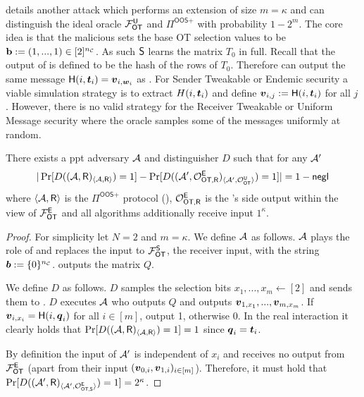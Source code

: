  details another attack which performs an extension of size $m=\kappa$ and can distinguish the ideal oracle $\OOT^\U$ and $\Pi^{\textsf{OOS+}}$ with probability $1-2^m$. The core idea is that the malicious \send sets the base OT selection values to be $\mathbf{b}:=(1,...,1)\in [2]^\nc$. As such $\send$ learns the matrix $T_0$ in full. Recall that the output of \rec is defined to be the hash of the rows of $T_0$. Therefore \send can output the same message $\H(i, \tt_i)=\vv_{i,\ww_i}$ as \rec. For Sender Tweakable or Endemic security a viable simulation strategy is to extract $H(i, \tt_i)$ and define $\vv_{i,j}:=\H(i, \tt_i)$ for all $j$. However, there is no valid strategy for the Receiver Tweakable or Uniform Message security where the oracle samples some of the messages uniformly at random.

\begin{lemma} \label{lem:malSend}
	There exists a ppt adversary $\Adv$ and distinguisher $D$ such that for any $\Adv'$ 
	$$
		|\Pr[D((\Adv, \rec)_{\langle\Adv,\rec\rangle})=1]-\Pr[D((\Adv', \O^{\E}_{\textsf{OT,\rec}})_{\langle\Adv',\O^{\U}_{\textsf{OT}}\rangle})=1]|=1-\negl
	$$
	where $\langle\Adv,\rec\rangle$ is the $\Pi^{\textsf{OOS+}}$ protocol (), $\O^{\E}_{\textsf{OT,\rec}}$ is the \rec's side output within the view of $\OOT^{\E}$ and all algorithms additionally receive input $1^\kappa$. 
\end{lemma}
\begin{proof} 
	For simplicity let $N=2$ and $m=\kappa$. We define $\Adv$ as follows. $\Adv$ plays the role of \send and replaces the input to $\OOT^\send$, the receiver input, with the string $\bb:=\{0\}^\nc$. \Adv outputs the matrix $Q$.
	
	We define $D$ as follows. $D$ samples the selection bits $x_1,...,x_m\gets[2]$ and sends them to \rec. $D$ executes $\Adv$ who outputs $Q$ and \rec outputs $\vv_{1,x_1},...,\vv_{m,x_m}$. If $\vv_{i,x_i}=\H(i,\qq_i)$ for all $i\in[m]$, output 1, otherwise 0. In the real interaction it clearly holds that $\Pr[D((\Adv, \rec)_{\langle\Adv,\rec\rangle})=1]=1$ since $\qq_i=\tt_i$.
	
	By definition the input of $\Adv'$ is independent of $x_i$ and receives no output from $\OOT^\E$ (apart from their input $(\vv_{0,i},\vv_{1,i})_{i\in [m]}$). Therefore, it must hold that $\Pr[D((\Adv', \rec)_{\langle\Adv',\O^{\E}_{\textsf{OT,\send}}\rangle})=1]=2^{\kappa}$.
\end{proof}





